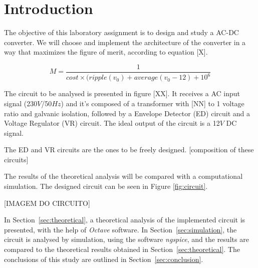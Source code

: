 \section{Introduction}
\label{sec:introduction}

\par The objective of this laboratory assignment is to design and study a AC-DC converter. We will choose and implement the architecture of the converter in a way that maximizes the figure of merit, according to equation [X].

\begin{equation}
    M = \frac{1}{cost \times (ripple(v_0) + average (v_0 - 12) + 10^6}
    \label{eq:v_s}
\end{equation}

The circuit to be analysed is presented in figure [XX]. It receives a AC input signal (230$V$/50$Hz$) and it's composed of a transformer with [NN] to 1 voltage ratio and galvanic isolation, followed by a Envelope Detector (ED) circuit and a Voltage Regulator (VR) circuit. The ideal output of the circuit is a 12$V$ DC signal. 

\par The ED and VR circuits are the ones to be freely designed.   
[composition of these circuits]

The results of the theoretical analysis will be compared with a computational simulation. The designed circuit can be seen in Figure \ref{fig:circuit}.

[IMAGEM DO CIRCUITO]


\par In Section~\ref{sec:theoretical}, a theoretical analysis of the implemented circuit is presented, with the help of \textit{Octave} software. In Section~\ref{sec:simulation}, the circuit is analysed by simulation, using the software \textit{ngspice}, and the results are compared to the theoretical results obtained in Section~\ref{sec:theoretical}. The conclusions of this study are outlined in Section~\ref{sec:conclusion}.